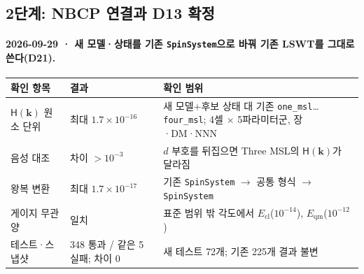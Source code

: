 \subsection{2단계: NBCP 연결과 D13 확정}\label{stage2-verification}
\begingroup%
  \framesubtitle{2026-09-29 · 새 모델·상태를 기존 \texttt{SpinSystem}으로 바꿔 기존 LSWT를 그대로 쓴다(D21).}
  \small
  \begin{tabularx}{\textwidth}{@{}p{3.4cm}p{3.3cm}Y@{}}
    \toprule
    확인 항목 & 결과 & 확인 범위 \\
    \midrule
    $\mathsf H(\mathbf k)$ 원소 단위 & 최대 $1.7\times10^{-16}$ & 새 모델+후보 상태 대 기존 \texttt{one\_msl}…\texttt{four\_msl}; 4셀 $\times$ 5파라미터군, 장·DM·NNN \\
    음성 대조 & 차이 $>10^{-3}$ & $d$ 부호를 뒤집으면 Three MSL의 $\mathsf H(\mathbf k)$가 달라짐 \\
    왕복 변환 & 최대 $1.7\times10^{-17}$ & 기존 \texttt{SpinSystem} $\to$ 공통 형식 $\to$ \texttt{SpinSystem} \\
    게이지 무관 양 & 일치 & 표준 범위 밖 각도에서 $E_{\mathrm{cl}}$($10^{-14}$), $E_{\mathrm{qm}}$($10^{-12}$) \\
    테스트·스냅샷 & 348 통과 / 같은 5 실패; 차이 0 & 새 테스트 72개; 기존 225개 결과 불변 \\
    \bottomrule
  \end{tabularx}
  \par\medskip
\endgroup


